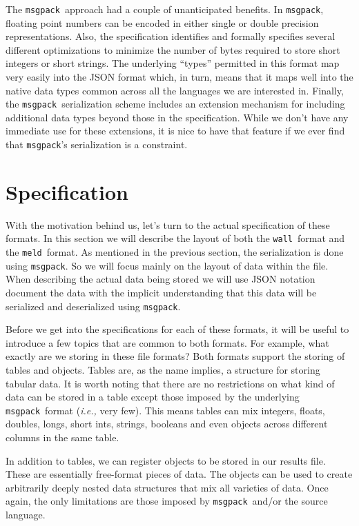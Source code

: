 \documentclass[11pt,a4paper,twocolumn]{article}
\newcommand{\wall}{\texttt{wall}}
\newcommand{\meld}{\texttt{meld}}
\newcommand{\msgpack}{\texttt{msgpack}}
\begin{document}
The \msgpack\ approach had a couple of unanticipated benefits.  In
\msgpack, floating point numbers can be encoded in either single or
double precision representations.  Also, the specification identifies
and formally specifies several different optimizations to minimize the
number of bytes required to store short integers or short strings.
The underlying ``types'' permitted in this format map very easily into
the JSON format which, in turn, means that it maps well into the
native data types common across all the languages we are interested
in.  Finally, the \msgpack\ serialization scheme includes an extension
mechanism for including additional data types beyond those in the
specification.  While we don't have any immediate use for these
extensions, it is nice to have that feature if we ever find that
\msgpack's serialization is a constraint.

\section{Specification}
\label{sec:spec}

With the motivation behind us, let's turn to the actual specification
of these formats.  In this section we will describe the layout of both
the \wall\ format and the \meld\ format.  As mentioned in the previous
section, the serialization is done using \msgpack.  So we will focus
mainly on the layout of data within the file.  When describing the
actual data being stored we will use JSON notation document the data
with the implicit understanding that this data will be serialized and
deserialized using \msgpack.


Before we get into the specifications for each of these formats, it
will be useful to introduce a few topics that are common to both
formats.  For example, what exactly are we storing in these file
formats?  Both formats support the storing of tables and objects.
Tables are, as the name implies, a structure for storing tabular data.
It is worth noting that there are no restrictions on what kind of data
can be stored in a table except those imposed by the underlying
\msgpack\ format (\textit{i.e.,} very few).  This means tables can mix
integers, floats, doubles, longs, short ints, strings, booleans and
even objects across different columns in the same table.

In addition to tables, we can register objects to be stored in our
results file.  These are essentially free-format pieces of data.  The
objects can be used to create arbitrarily deeply nested data
structures that mix all varieties of data.  Once again, the only
limitations are those imposed by \msgpack\ and/or the source language.
\end{document}
